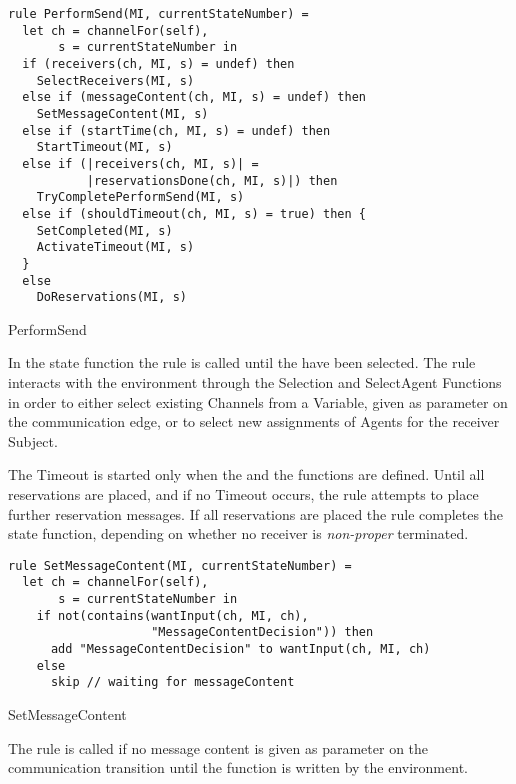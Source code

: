 \begin{listing}[htbp]
\begin{verbatim}
rule PerformSend(MI, currentStateNumber) =
  let ch = channelFor(self),
       s = currentStateNumber in
  if (receivers(ch, MI, s) = undef) then
    SelectReceivers(MI, s)
  else if (messageContent(ch, MI, s) = undef) then
    SetMessageContent(MI, s)
  else if (startTime(ch, MI, s) = undef) then
    StartTimeout(MI, s)
  else if (|receivers(ch, MI, s)| =
           |reservationsDone(ch, MI, s)|) then
    TryCompletePerformSend(MI, s)
  else if (shouldTimeout(ch, MI, s) = true) then {
    SetCompleted(MI, s)
    ActivateTimeout(MI, s)
  }
  else
    DoReservations(MI, s)
\end{verbatim}
\caption{PerformSend}
\label{lst:shortasm:PerformSend}
\end{listing}


In the state function the  rule is called until the  have been selected. The  rule interacts with the environment through the Selection and SelectAgent Functions in order to either select existing Channels from a Variable, given as parameter on the communication edge, or to select new assignments of Agents for the receiver Subject.

The Timeout is started only when the  and the  functions are defined. Until all reservations are placed, and if no Timeout occurs, the  rule attempts to place further reservation messages. If all reservations are placed the  rule completes the state function, depending on whether no receiver is \textit{non-proper} terminated.


\begin{listing}[htbp]
\begin{verbatim}
rule SetMessageContent(MI, currentStateNumber) =
  let ch = channelFor(self),
       s = currentStateNumber in
    if not(contains(wantInput(ch, MI, ch),
                    "MessageContentDecision")) then
      add "MessageContentDecision" to wantInput(ch, MI, ch)
    else
      skip // waiting for messageContent
\end{verbatim}
\caption{SetMessageContent}
\label{lst:shortasm:SetMessageContent}
\end{listing}

The  rule is called if no message content is given as parameter on the communication transition until the  function is written by the environment.


